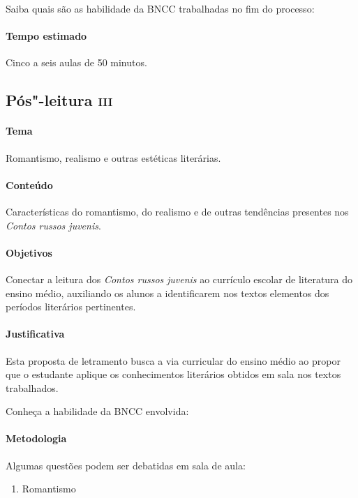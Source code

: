 \documentclass[11pt]{extarticle}
\begin{document}
Saiba quais são as habilidade da BNCC trabalhadas no fim do processo:

\paragraph{Tempo estimado} Cinco a seis aulas de 50 minutos.


\subsection{Pós"-leitura \textsc{iii}}

\paragraph{Tema} Romantismo, realismo e outras estéticas literárias.

\paragraph{Conteúdo}
Características do romantismo, do realismo e de outras tendências
presentes nos \emph{Contos russos juvenis}.

\paragraph{Objetivos}
Conectar a leitura dos \emph{Contos russos} \emph{juvenis} ao currículo
escolar de literatura do ensino médio, auxiliando os alunos a
identificarem nos textos elementos dos períodos literários pertinentes.

\paragraph{Justificativa}
Esta proposta de letramento busca a via curricular do ensino médio ao
propor que o estudante aplique os conhecimentos literários obtidos em
sala nos textos trabalhados.

Conheça a habilidade da BNCC envolvida:

\paragraph{Metodologia}
Algumas questões podem ser debatidas em sala de aula:

\begin{enumerate}
\item Romantismo
\end{enumerate}
\end{document}
